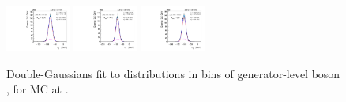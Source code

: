 \begin{figure}[htb]
\includegraphics[width=0.19\textwidth]{plots/Appendix_Recoil_Fits/WmmMC_PF_5TeV_2G/pfu1fit_32.pdf}
\includegraphics[width=0.19\textwidth]{plots/Appendix_Recoil_Fits/WmmMC_PF_5TeV_2G/pfu1fit_33.pdf}
\includegraphics[width=0.19\textwidth]{plots/Appendix_Recoil_Fits/WmmMC_PF_5TeV_2G/pfu1fit_34.pdf}
\caption{Double-Gaussians fit to \upar distributions in bins of generator-level boson \pt, for \Wm MC at \serag.}
\label{fig:a:recoil:fit:mc:u1:13}
\end{figure}